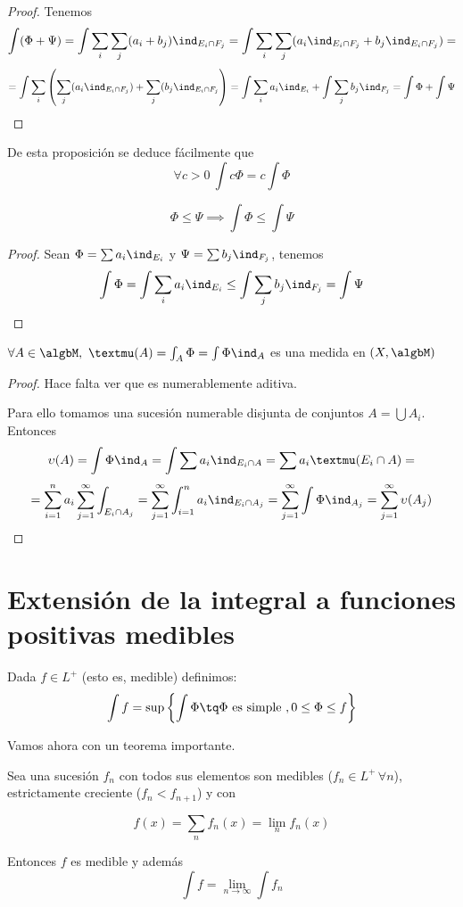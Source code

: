 \documentclass{apuntes}
\begin{document}
\begin{proof} Tenemos
\[\int (\Phi + \Psi) =\int \sum_i \sum_j (a_i+b_j)\ind_{E_i \cap F_j} =\int \sum_i \sum_j (a_i \ind_{E_i \cap F_j} + b_j \ind_{E_i \cap F_j}) = \]
\[=\int \sum_i \left( \sum_j (a_i \ind_{E_i \cap F_j}) + \sum_j (b_j \ind_{E_i \cap F_j}\right) =\int \sum_i a_i \ind_{E_i} + \int \sum_j b_j \ind_{F_j} = \int \Phi + \int \Psi\]
\end{proof}

De esta proposición se deduce fácilmente que
\[\forall c > 0 \ \int c\Phi = c\int \Phi\]

\begin{prop}
\[\Phi \leq \Psi \implies \int \Phi \leq \int \Psi\]
\end{prop}
\begin{proof}
Sean $\Phi = \sum a_i \ind_{E_i}$ y $\Psi  = \sum b_j \ind_{F_j}$, tenemos
\[\int \Phi = \int \sum_i a_i \ind_{E_i} \leq \int \sum_j b_j \ind_{F_j} = \int \Psi\]
\end{proof}

\begin{prop}
$\forall A \in \algbM, \ µ(A) = \int_A \Phi = \int \Phi \ind_A$ es una medida en $(X, \algbM)$
\end{prop}
\begin{proof}
Hace falta ver que es numerablemente aditiva.

Para ello tomamos una sucesión numerable disjunta de conjuntos $A=\bigcup A_i$.
Entonces
\[\upsilon(A) = \int \Phi \ind_A = \int \sum a_i \ind_{E_i \cap A} = \sum a_i µ(E_i \cap A) = \]
\[= \sum_{i=1}^n a_i \sum_{j=1}^{\infty}\int_{E_i \cap A_j} = \sum_{j=1}^{\infty}\int_{i=1}^n a_i \ind_{E_i \cap A_j} = \sum_{j=1}^{\infty} \int \Phi \ind_{A_j} = \sum_{j=1}^{\infty} \upsilon(A_j)\]
\end{proof}

\section{Extensión de la integral a funciones positivas medibles}
\begin{defn}
Dada $f \in L^+$ (esto es, medible) definimos:
\[\int f = \sup\left\lbrace\int \Phi \tq \Phi \text{ es simple }, 0 \leq \Phi \leq f\right\rbrace\]
\end{defn}

Vamos ahora con un teorema importante.
\begin{theorem}

Sea una sucesión $f_n$ con todos sus elementos son medibles ($f_n ∈ L^+ \,∀n$), estrictamente creciente ($f_n < f_{n+1}$) y con

\[ f(x) = \sum_n f_n(x) = \lim_n f_n(x)\]

Entonces $f$ es medible y además
\[\int f = \lim_{n\to ∞} \int f_n \]
\end{theorem}
\end{document}
